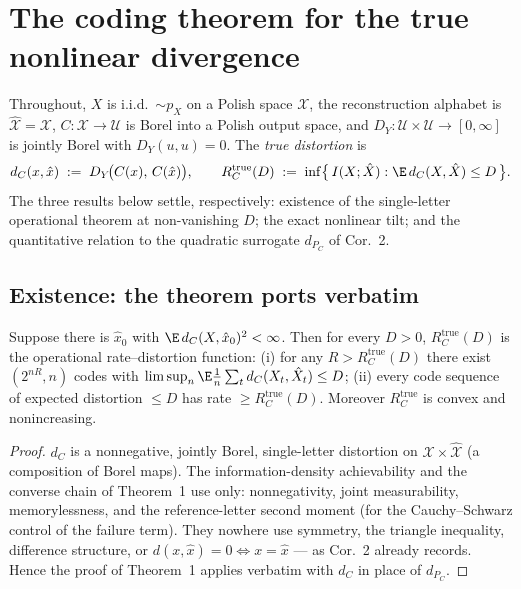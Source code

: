 
\section{The coding theorem for the true nonlinear divergence}
\label{app:true}

Throughout, $X$ is i.i.d.\ $\sim p_X$ on a Polish space $\mathcal{X}$, the
reconstruction alphabet is $\hat{\mathcal{X}}=\mathcal{X}$, $C:\mathcal{X}\to\mathcal{U}$
is Borel into a Polish output space, and $D_Y:\mathcal{U}\times\mathcal{U}\to[0,\infty]$
is jointly Borel with $D_Y(u,u)=0$. The \emph{true distortion} is
\[
d_C(x,\hat{x}) \;:=\; D_Y\!\bigl(C(x),\,C(\hat{x})\bigr),
\qquad
R_C^{\mathrm{true}}(D) \;:=\; \inf\bigl\{\, I(X;\hat{X}) : \E\, d_C(X,\hat X)\le D \,\bigr\}.
\]
The three results below settle, respectively: existence of the single-letter
operational theorem at non-vanishing $D$; the exact nonlinear tilt; and the
quantitative relation to the quadratic surrogate $d_{P_C}$ of Cor.~2.

\subsection{Existence: the theorem ports verbatim}

\begin{theorem}
\label{thm:B1}
Suppose there is $\hat x_0$ with $\E\,d_C(X,\hat x_0)^2<\infty$. Then for every
$D>0$, $R_C^{\mathrm{true}}(D)$ is the operational rate--distortion function:
(i) for any $R>R_C^{\mathrm{true}}(D)$ there exist $(2^{nR},n)$ codes with
$\limsup_n \E\frac1n\sum_t d_C(X_t,\hat X_t)\le D$; (ii) every code sequence of
expected distortion $\le D$ has rate $\ge R_C^{\mathrm{true}}(D)$. Moreover
$R_C^{\mathrm{true}}$ is convex and nonincreasing.
\end{theorem}

\begin{proof}
$d_C$ is a nonnegative, jointly Borel, single-letter distortion on
$\mathcal{X}\times\hat{\mathcal{X}}$ (a composition of Borel maps). The
information-density achievability and the converse chain of Theorem~1 use only:
nonnegativity, joint measurability, memorylessness, and the reference-letter
second moment (for the Cauchy--Schwarz control of the failure term). They
nowhere use symmetry, the triangle inequality, difference structure, or
$d(x,\hat x)=0\iff x=\hat x$ --- as Cor.~2 already records. Hence the proof of
Theorem~1 applies verbatim with $d_C$ in place of $d_{P_C}$.
\end{proof}

